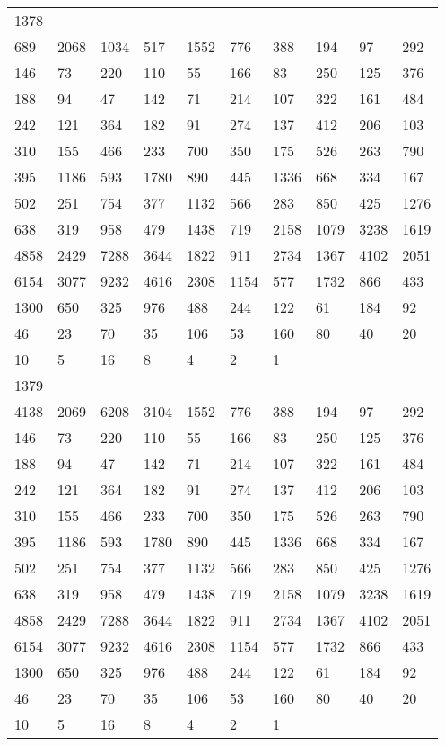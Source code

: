 \begin{longtable}{*{10}{l}}
1378&&&&&&&&&\\
689& 2068& 1034& 517& 1552& 776& 388& 194& 97& 292\\
146& 73& 220& 110& 55& 166& 83& 250& 125& 376\\
188& 94& 47& 142& 71& 214& 107& 322& 161& 484\\
242& 121& 364& 182& 91& 274& 137& 412& 206& 103\\
310& 155& 466& 233& 700& 350& 175& 526& 263& 790\\
395& 1186& 593& 1780& 890& 445& 1336& 668& 334& 167\\
502& 251& 754& 377& 1132& 566& 283& 850& 425& 1276\\
638& 319& 958& 479& 1438& 719& 2158& 1079& 3238& 1619\\
4858& 2429& 7288& 3644& 1822& 911& 2734& 1367& 4102& 2051\\
6154& 3077& 9232& 4616& 2308& 1154& 577& 1732& 866& 433\\
1300& 650& 325& 976& 488& 244& 122& 61& 184& 92\\
46& 23& 70& 35& 106& 53& 160& 80& 40& 20\\
10& 5& 16& 8& 4& 2& 1& \\

1379&&&&&&&&&\\
4138& 2069& 6208& 3104& 1552& 776& 388& 194& 97& 292\\
146& 73& 220& 110& 55& 166& 83& 250& 125& 376\\
188& 94& 47& 142& 71& 214& 107& 322& 161& 484\\
242& 121& 364& 182& 91& 274& 137& 412& 206& 103\\
310& 155& 466& 233& 700& 350& 175& 526& 263& 790\\
395& 1186& 593& 1780& 890& 445& 1336& 668& 334& 167\\
502& 251& 754& 377& 1132& 566& 283& 850& 425& 1276\\
638& 319& 958& 479& 1438& 719& 2158& 1079& 3238& 1619\\
4858& 2429& 7288& 3644& 1822& 911& 2734& 1367& 4102& 2051\\
6154& 3077& 9232& 4616& 2308& 1154& 577& 1732& 866& 433\\
1300& 650& 325& 976& 488& 244& 122& 61& 184& 92\\
46& 23& 70& 35& 106& 53& 160& 80& 40& 20\\
10& 5& 16& 8& 4& 2& 1& \\


\end{longtable}
